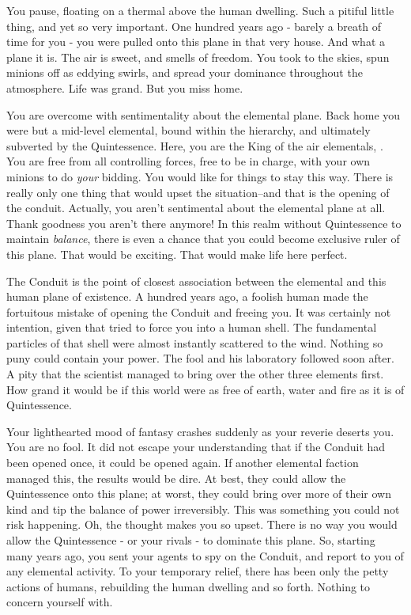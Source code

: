 \documentclass[char]{elementals}
\begin{document}
\name{\cKing{}}


You pause, floating on a thermal above the human dwelling. Such a pitiful little thing, and yet so very important. One hundred years ago - barely a breath of time for you - you were pulled onto this plane in that very house. And what a plane it is. The air is sweet, and smells of freedom. You took to the skies, spun minions off as eddying swirls, and spread your dominance throughout the atmosphere.  Life was grand. But you miss home.

You are overcome with sentimentality about the elemental plane. Back home you were but a mid-level elemental, bound within the hierarchy, and ultimately subverted by the Quintessence. Here, you are the King of the air elementals, \cKing{\intro}. You are free from all controlling forces, free to be in charge, with your own minions to do \emph{your} bidding. You would like for things to stay this way. There is really only one thing that would upset the situation--and that is the opening of the conduit. Actually, you aren't sentimental about the elemental plane at all. Thank goodness you aren't there anymore! In this realm without Quintessence to maintain \emph{balance}, there is even a chance that you could become exclusive ruler of this plane. That would be exciting. That would make life here perfect.

The Conduit is the point of closest association between the elemental and this human plane of existence. A hundred years ago, a foolish human made the fortuitous mistake of opening the Conduit and freeing you. It was certainly not \cGrandfather{\their} intention, given that \cGrandfather{\they} tried to force you into a human shell. The fundamental particles of that shell were almost instantly scattered to the wind. Nothing so puny could contain your power. The fool and his laboratory followed soon after. A pity that the scientist managed to bring over the other three elements first. How grand it would be if this world were as free of earth, water and fire as it is of Quintessence.

Your lighthearted mood of fantasy crashes suddenly as your reverie deserts you. You are no fool. It did not escape your understanding that if the Conduit had been opened once, it could be opened again. If another elemental faction managed this, the results would be dire. At best, they could allow the Quintessence onto this plane; at worst, they could bring over more of their own kind and tip the balance of power irreversibly. This was something you could not risk happening. Oh, the thought makes you so upset. There is no way you would allow the Quintessence - or your rivals - to dominate this plane. So, starting many years ago, you sent your agents to spy on the Conduit, and report to you of any elemental activity. To your temporary relief, there has been only the petty actions of humans, rebuilding the human dwelling and so forth. Nothing to concern yourself with.
\end{document}
